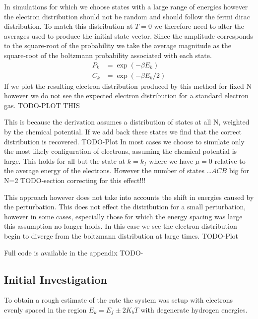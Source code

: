 In simulations for which we choose states
with a large range of energies however
the electron distribution should not be
random and should follow the fermi dirac distribution.
To match this distribution at \(T=0\) we therefore
need to alter the averages used
to produce the initial state vector.
Since the amplitude corresponds to
the square-root of the probability we
take the average magnitude as the
square-root of the boltzmann probability
associated with each state.
\begin{align}
    P_k & = \exp(-\beta{}E_k)     \\
    C_k & = \exp(-\beta{}E_k / 2)
\end{align}
If we plot the resulting
electron distribution produced
by this method for fixed N however
we do not see the expected electron
distribution for a standard electron
gas.
TODO-PLOT THIS

This is because the
derivation assumes a distribution
of states at all N, weighted by the
chemical potential. If we add back
these states we find that the correct
distribution is recovered.
TODO-Plot
In most cases we choose to
simulate only the most
likely configuration of electrons,
assuming the chemical potential is large.
This holds for all but the state at
\(k = k_f\) where we have \(\mu = 0\)
relative to the average energy of the
electrons. However the number of
states \ldots \(ACB\) big for N=2
TODO-section correcting for this effect!!!


This approach however does not take
into accounts the shift in energies
caused by the perturbation. This
does not effect the distribution
for a small perturbation,
however in some cases,
especially those for which the energy
spacing was large this assumption
no longer holds. In this case
we see the electron distribution
begin to diverge from the
boltzmann distribution at large times.
TODO-Plot


Full code is available in the appendix TODO-






\subsection{Initial Investigation}
To obtain a rough estimate of
the rate the system was setup
with electrons evenly spaced
in the region \(E_k = E_f \pm 2K_b T\)
with degenerate hydrogen energies.

